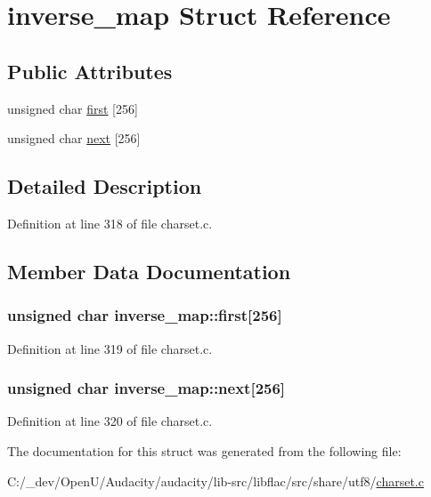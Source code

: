 \hypertarget{structinverse__map}{}\section{inverse\+\_\+map Struct Reference}
\label{structinverse__map}
\subsection*{Public Attributes}
\begin{DoxyCompactItemize}
\item 
unsigned char \hyperlink{structinverse__map_a0972e8c2a20b9b571af50815217cb0b2}{first} \mbox{[}256\mbox{]}
\item 
unsigned char \hyperlink{structinverse__map_ab1ed2a7a0fb1bc3e814d8bc04bb0269e}{next} \mbox{[}256\mbox{]}
\end{DoxyCompactItemize}


\subsection{Detailed Description}


Definition at line 318 of file charset.\+c.



\subsection{Member Data Documentation}
\subsubsection[{\texorpdfstring{first}{first}}]{\setlength{\rightskip}{0pt plus 5cm}unsigned char inverse\+\_\+map\+::first\mbox{[}256\mbox{]}}\hypertarget{structinverse__map_a0972e8c2a20b9b571af50815217cb0b2}{}\label{structinverse__map_a0972e8c2a20b9b571af50815217cb0b2}


Definition at line 319 of file charset.\+c.

\subsubsection[{\texorpdfstring{next}{next}}]{\setlength{\rightskip}{0pt plus 5cm}unsigned char inverse\+\_\+map\+::next\mbox{[}256\mbox{]}}\hypertarget{structinverse__map_ab1ed2a7a0fb1bc3e814d8bc04bb0269e}{}\label{structinverse__map_ab1ed2a7a0fb1bc3e814d8bc04bb0269e}


Definition at line 320 of file charset.\+c.



The documentation for this struct was generated from the following file\+:\begin{DoxyCompactItemize}
\item 
C\+:/\+\_\+dev/\+Open\+U/\+Audacity/audacity/lib-\/src/libflac/src/share/utf8/\hyperlink{share_2utf8_2charset_8c}{charset.\+c}\end{DoxyCompactItemize}
